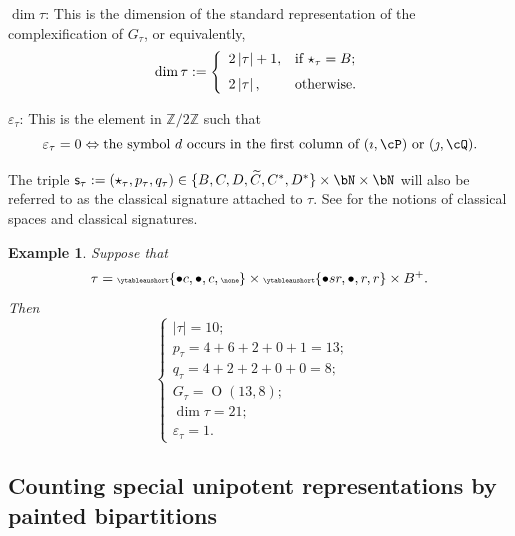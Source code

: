 \documentclass[11pt,a4paper]{amsart}
\def\abs#1{\left|{#1}\right|}
\newcommand{\oO}{\operatorname{O}}
\newcommand{\Z}{\mathbb{Z}}
\newcommand{\be}{\begin {equation}}
\newcommand{\ee}{\end {equation}}
\numberwithin{equation}{section}
\newtheorem{eg}[thm]{Example}
\theoremstyle{remark}
\let\ytb=\ytableaushort
\newcommand{\tytb}[1]{{\tiny\ytb{#1}}}
\begin{document}
\smallskip


 \smallskip
 
\noindent $\dim \tau$:
This is the dimension of the standard representation of the complexification of $G_\tau$, or equivalently,
 \begin{equation}\label{def:dimtau}
 \dim \tau:= \left\{
     \begin{array}{ll}
          2\abs{ \tau}+1, &\hbox{if $\star_\tau=B$}; \medskip\\
         2 \abs{\tau}, &\hbox{otherwise}.
            \end{array}
   \right.
 \end{equation}
 
 \smallskip
 
 \smallskip

  
  \noindent $\varepsilon_\tau$:
This is the element in $\Z/2\Z$ such that
\be\label{epsilontau}
  \varepsilon_\tau=0\Leftrightarrow  \textrm{the symbol $d$ occurs in the first column of $( \imath, \cP)$ or $(\jmath, \cQ)$}.
\ee

 \smallskip


The triple $\mathsf s_{\tau}:=(\star_{\tau}, p_{\tau},q_{\tau})\in  \{B,C,D, \widetilde C, C^*, D^*\}\times \bN\times \bN$ will also be referred to as the classical signature attached to $\tau$. See  for the notions of classical spaces and classical signatures.  
\smallskip

\begin{eg} Suppose that
\[
\tau= \tytb{\bullet c ,\bullet , c,\none } \times \tytb{\bullet s r ,\bullet ,r, r }\times B^+.
\]
Then
\[
\begin{cases}
\abs{\tau}=10;\\
 p_\tau=4+6+2+0+1=13; \quad\\
 q_\tau=4+2+2+0+0=8; \quad \\
 G_\tau=\oO(13,8);\quad \\
 \dim \tau=21;\\
 \varepsilon_\tau=1.
 \end{cases}
 \]

\end{eg}


\subsection{Counting special unipotent representations by painted bipartitions}\label{subsec:countbip}
\end{document}
